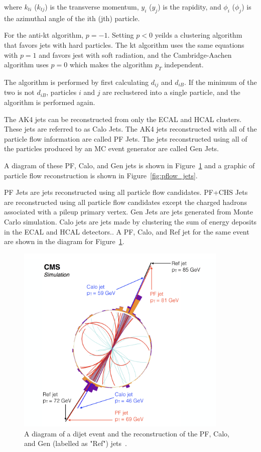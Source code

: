 where $k_{ti}$ ($k_{tj}$) is the transverse momentum, $y_i$ ($y_j$) is the rapidity, and $\phi_i$ ($\phi_j$) is the azimuthal angle of the ith (jth) particle.

For the anti-kt algorithm, $p=-1$. Setting $p<0$ yeilds a clustering algorithm that favors jets with hard particles. The kt algorithm uses the same equations with $p=1$ and favors jest with soft radiation, and the Cambridge-Aachen algorithm uses $p=0$ which makes the algorithm $p_T$ independent.

The algorithm is performed by first calculating $d_{ij}$ and $d_{iB}$. If the minimum of the two is not $d_{iB}$, particles $i$ and $j$ are reclustered into a single particle, and the algorithm is performed again.

The AK4 jets can be reconstructed from only the ECAL and HCAL clusters. These jets are referred to as Calo Jets. The AK4 jets reconstructed with all of the particle flow information are called PF Jets. The jets reconstructed using all of the particles produced by an MC event generator are called Gen Jets. 


A diagram of these PF, Calo, and Gen jets is shown in Figure~\ref{fig:pfjet} and a graphic of particle flow reconstruction is shown in Figure~\ref{fig:pflow_jets}.


PF Jets are jets reconstructed using all particle flow candidates. PF+CHS Jets are reconstructed using all particle flow candidates except the charged hadrons associated with a pileup primary vertex. Gen Jets are jets generated from Monte Carlo simulation. Calo jets are jets made by clustering the sum of energy deposits in the ECAL and HCAL detectors.. A PF, Calo, and Ref jet for the same event are shown in the diagram for Figure~\ref{fig:pfjet}.

\begin{figure}[h]
\centering
\includegraphics[width=0.9\textwidth]{figures/pf_jet_diagram}
\caption{A diagram of a dijet event and the reconstruction of the PF, Calo, and Gen (labelled as "Ref") jets~\cite{pflow}.}
\label{fig:pfjet}
\end{figure}



